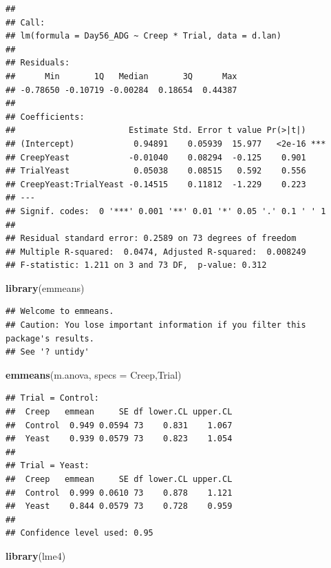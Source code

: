 \documentclass[
]{book}
\newenvironment{Shaded}{\begin{snugshade}}{\end{snugshade}}
\newcommand{\AttributeTok}[1]{\textcolor[rgb]{0.13,0.29,0.53}{#1}}
\newcommand{\FunctionTok}[1]{\textcolor[rgb]{0.13,0.29,0.53}{\textbf{#1}}}
\newcommand{\NormalTok}[1]{#1}
\newcommand{\StringTok}[1]{\textcolor[rgb]{0.31,0.60,0.02}{#1}}
\begin{document}
\begin{verbatim}
## 
## Call:
## lm(formula = Day56_ADG ~ Creep * Trial, data = d.lan)
## 
## Residuals:
##      Min       1Q   Median       3Q      Max 
## -0.78650 -0.10719 -0.00284  0.18654  0.44387 
## 
## Coefficients:
##                       Estimate Std. Error t value Pr(>|t|)    
## (Intercept)            0.94891    0.05939  15.977   <2e-16 ***
## CreepYeast            -0.01040    0.08294  -0.125    0.901    
## TrialYeast             0.05038    0.08515   0.592    0.556    
## CreepYeast:TrialYeast -0.14515    0.11812  -1.229    0.223    
## ---
## Signif. codes:  0 '***' 0.001 '**' 0.01 '*' 0.05 '.' 0.1 ' ' 1
## 
## Residual standard error: 0.2589 on 73 degrees of freedom
## Multiple R-squared:  0.0474, Adjusted R-squared:  0.008249 
## F-statistic: 1.211 on 3 and 73 DF,  p-value: 0.312
\end{verbatim}

\begin{Shaded}
\begin{Highlighting}[]
\FunctionTok{library}\NormalTok{(emmeans)}
\end{Highlighting}
\end{Shaded}

\begin{verbatim}
## Welcome to emmeans.
## Caution: You lose important information if you filter this package's results.
## See '? untidy'
\end{verbatim}

\begin{Shaded}
\begin{Highlighting}[]
\FunctionTok{emmeans}\NormalTok{(m.anova, }\AttributeTok{specs =} \StringTok{\textquotesingle{}Creep\textquotesingle{}}\NormalTok{,}\StringTok{\textquotesingle{}Trial\textquotesingle{}}\NormalTok{)}
\end{Highlighting}
\end{Shaded}

\begin{verbatim}
## Trial = Control:
##  Creep   emmean     SE df lower.CL upper.CL
##  Control  0.949 0.0594 73    0.831    1.067
##  Yeast    0.939 0.0579 73    0.823    1.054
## 
## Trial = Yeast:
##  Creep   emmean     SE df lower.CL upper.CL
##  Control  0.999 0.0610 73    0.878    1.121
##  Yeast    0.844 0.0579 73    0.728    0.959
## 
## Confidence level used: 0.95
\end{verbatim}

\begin{Shaded}
\begin{Highlighting}[]
\FunctionTok{library}\NormalTok{(lme4)}
\end{Highlighting}
\end{Shaded}
\end{document}
